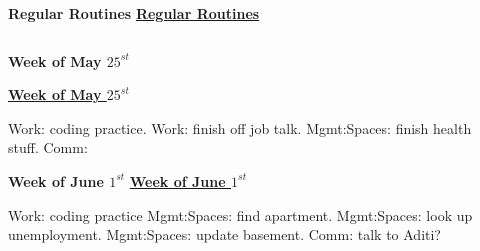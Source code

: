 \begin{columns}
\begin{column}{0.333\columnwidth}
\begin{columns}
\ifdefined\POSTER
\begin{column}{0.28\linewidth}
\begin{block}{\small \bf Regular Routines}
\else
\underline{\bf Regular Routines}\\ 
\fi 

%


\ifdefined\POSTER
\end{block}
\end{column}%
\fi

\ifdefined\POSTER
\end{columns}
\fi
\begin{columns}

\begin{column}{0.5\columnwidth}



\ifdefined\POSTER
\begin{block}{\small \bf Week of May $25^{st}$}
\else

\underline{\bf Week of May $25^{st}$}\\ 
\fi 
\begin{framed}
\begin{enumerate} 
\mpitem Work: coding practice. 
\mpitem Work: finish off job talk. 
\mpitem Mgmt:Spaces: finish health stuff. 
\mpitem Comm: 
\end{enumerate}
\end{framed}

\ifdefined\POSTER
\end{block}
\fi

\ifdefined\POSTER
\begin{block}{\small \bf Week of June $1^{st}$}
\else
\underline{\bf Week of June $1^{st}$}\\
\fi

\begin{framed}
\begin{enumerate}
\mpitem Work: coding practice
\mpitem Mgmt:Spaces: find apartment. 
\mpitem Mgmt:Spaces: look up unemployment. 
\mpitem Mgmt:Spaces: update basement. 
\mpitem Comm: talk to Aditi? 
\end{enumerate}
\end{framed}
\ifdefined\POSTER
\end{block}
\fi


\end{column}


\begin{column}{0.5\columnwidth}


\end{column}
\end{columns}
\end{column}
\end{columns}
